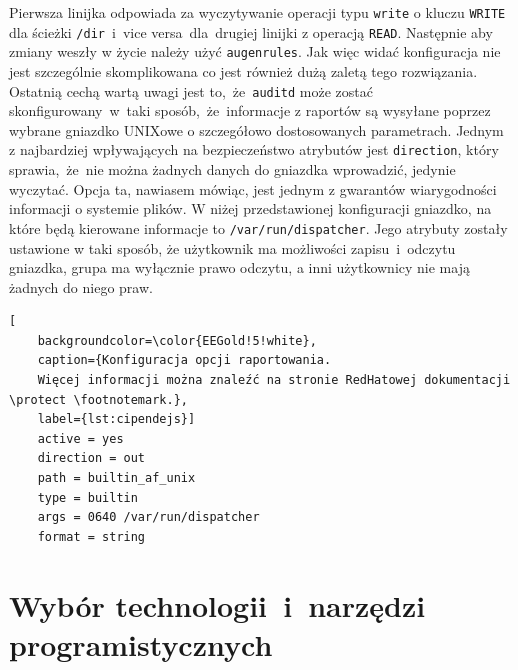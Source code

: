 Pierwsza linijka odpowiada za wyczytywanie operacji typu \texttt{write} o kluczu \texttt{WRITE} dla ścieżki \texttt{/dir}~i~vice versa~dla~drugiej linijki z operacją \texttt{READ}. Następnie aby zmiany weszły w życie należy użyć \texttt{augenrules}. Jak więc widać konfiguracja nie jest szczególnie skomplikowana co jest również dużą zaletą tego rozwiązania. 
\newline
Ostatnią cechą wartą uwagi jest to,~że~\texttt{auditd} może zostać skonfigurowany~w~taki sposób,~że~informacje z raportów są wysyłane poprzez wybrane gniazdko UNIXowe o szczegółowo dostosowanych parametrach. Jednym z najbardziej wpływających na bezpieczeństwo atrybutów jest \texttt{direction}, który sprawia,~że~nie można żadnych danych do gniazdka wprowadzić, jedynie wyczytać. Opcja ta, nawiasem mówiąc, jest jednym z gwarantów wiarygodności informacji o systemie plików. W niżej przedstawionej konfiguracji gniazdko, na które będą kierowane informacje to \texttt{/var/run/dispatcher}. Jego atrybuty zostały ustawione w taki sposób, że użytkownik ma możliwości zapisu~i~odczytu gniazdka, grupa ma wyłącznie prawo odczytu, a inni użytkownicy nie mają żadnych do niego praw.
\begin{lstlisting}[
    backgroundcolor=\color{EEGold!5!white},
    caption={Konfiguracja opcji raportowania. 
    Więcej informacji można znaleźć na stronie RedHatowej dokumentacji \protect \footnotemark.},
    label={lst:cipendejs}]
    active = yes
    direction = out
    path = builtin_af_unix
    type = builtin
    args = 0640 /var/run/dispatcher
    format = string
\end{lstlisting}
\newpage

\section{Wybór technologii~i~narzędzi programistycznych}
